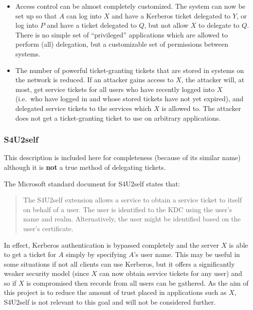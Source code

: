 \documentclass{article}
\begin{document}
\begin{itemize}
\item
  Access control can be almost completely customized. The system can now be set up so that $A$ can log into $X$ and have a Kerberos ticket delegated to $Y$, or log into $P$ and have a ticket delegated to $Q$, but not allow $X$ to delegate to $Q$. There is no simple set of ``privileged'' applications which are allowed to perform (all) delegation, but a customizable set of permissions between systems.
\item
  The number of powerful ticket-granting tickets that are stored in systems on the network is reduced. If an attacker gains access to $X$, the attacker will, at most, get service tickets for all users who have recently logged into $X$ (i.e.\ who have logged in and whose stored tickets have not yet expired), and delegated service tickets to the services which $X$ is allowed to. The attacker does not get a ticket-granting ticket to use on arbitrary applications.
\end{itemize}

\subsubsection{S4U2self}
This description is included here for completeness (because of its similar name) although it is \textbf{not} a true method of delegating tickets.

The Microsoft standard document for S4U2self\cite{MS-s4u2} states that:

\begin{quote}
  The S4U2self extension allows a service to obtain a service ticket to itself on behalf of a user. The user is identified to the KDC using the user's name and realm. Alternatively, the user might be identified based on the user's certificate.
\end{quote}

In effect, Kerberos authentication is bypassed completely and the server $X$ is able to get a ticket for $A$ simply by specifying $A$'s user name. This may be useful in some situations if not all clients can use Kerberos, but it offers a significantly weaker security model (since $X$ can now obtain service tickets for any user) and so if $X$ is compromised then records from all users can be gathered. As the aim of this project is to reduce the amount of trust placed in applications such as $X$, S4U2self is not relevant to this goal and will not be considered further.
\end{document}
